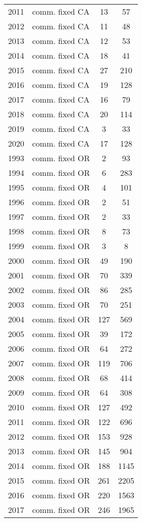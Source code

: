 \begin{longtable}[t]{c>{\centering\arraybackslash}p{4cm}cc}
2011 & comm. fixed CA & 13 & 57\\
2012 & comm. fixed CA & 11 & 48\\
2013 & comm. fixed CA & 12 & 53\\
2014 & comm. fixed CA & 18 & 41\\
2015 & comm. fixed CA & 27 & 210\\
2016 & comm. fixed CA & 19 & 128\\
2017 & comm. fixed CA & 16 & 79\\
2018 & comm. fixed CA & 20 & 114\\
2019 & comm. fixed CA & 3 & 33\\
2020 & comm. fixed CA & 17 & 128\\
1993 & comm. fixed OR & 2 & 93\\
1994 & comm. fixed OR & 6 & 283\\
1995 & comm. fixed OR & 4 & 101\\
1996 & comm. fixed OR & 2 & 51\\
1997 & comm. fixed OR & 2 & 33\\
1998 & comm. fixed OR & 8 & 73\\
1999 & comm. fixed OR & 3 & 8\\
2000 & comm. fixed OR & 49 & 190\\
2001 & comm. fixed OR & 70 & 339\\
2002 & comm. fixed OR & 86 & 285\\
2003 & comm. fixed OR & 70 & 251\\
2004 & comm. fixed OR & 127 & 569\\
2005 & comm. fixed OR & 39 & 172\\
2006 & comm. fixed OR & 64 & 272\\
2007 & comm. fixed OR & 119 & 706\\
2008 & comm. fixed OR & 68 & 414\\
2009 & comm. fixed OR & 64 & 308\\
2010 & comm. fixed OR & 127 & 492\\
2011 & comm. fixed OR & 122 & 696\\
2012 & comm. fixed OR & 153 & 928\\
2013 & comm. fixed OR & 145 & 904\\
2014 & comm. fixed OR & 188 & 1145\\
2015 & comm. fixed OR & 261 & 2205\\
2016 & comm. fixed OR & 220 & 1563\\
2017 & comm. fixed OR & 246 & 1965\\

\end{longtable}
